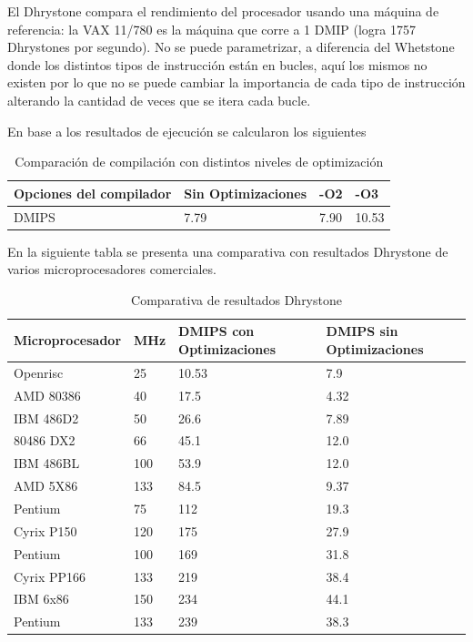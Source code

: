 El Dhrystone compara el rendimiento del procesador usando una máquina de referencia: la VAX 11/780 es la máquina que corre a 1 DMIP (logra 1757
Dhrystones por segundo). No se puede parametrizar, a diferencia del Whetstone donde los distintos tipos de instrucción están en bucles, aquí los
mismos no existen por lo que no se puede cambiar la importancia de cada tipo de instrucción alterando la cantidad de veces que se itera cada bucle.

En base a los resultados de ejecución se calcularon los siguientes 

\begin{table}[h!]
\begin{center}
\begin{tabular}{ |l |l |l |l |}
\hline
\rowcolor[gray]{0.8} Opciones del compilador& Sin Optimizaciones & -O2 &-O3 \\
\hline
DMIPS 					& 7.79 			&   7.90  &  10.53  \\
\hline
\end{tabular}
\end{center}
\caption{Comparación de compilación con distintos niveles de optimización}
\end{table}


En la siguiente tabla se presenta una comparativa con resultados Dhrystone de varios microprocesadores comerciales.

\begin{table}[h!]
\begin{center}
\begin{tabular}{ |l |l |l |l |}
\hline
\rowcolor[gray]{0.8} Microprocesador& MHz & DMIPS con Optimizaciones & DMIPS sin Optimizaciones \\
\hline
Openrisc		  &25	&10.53	&7.9\\
\hline
AMD 80386         &40   &17.5   &4.32\\
\hline
IBM 486D2         &50   &26.6   &7.89\\
\hline
80486 DX2         &66   &45.1   &12.0\\
\hline
IBM 486BL        &100   &53.9   &12.0\\
\hline
AMD 5X86         &133   &84.5   &9.37\\
\hline
Pentium           &75    &112   &19.3\\
\hline
Cyrix P150       &120    &175   &27.9\\
\hline
Pentium          &100    &169   &31.8\\
\hline
Cyrix PP166      &133    &219   &38.4\\
\hline
IBM 6x86         &150    &234   &44.1\\
\hline
Pentium          &133    &239   &38.3\\
\hline
\end{tabular}
\end{center}
\caption{Comparativa de resultados Dhrystone}
\end{table}



